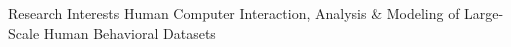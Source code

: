 
\begin{rSection}{Research Interests}
Human Computer Interaction, Analysis \& Modeling of Large-Scale Human Behavioral Datasets
\end{rSection}

